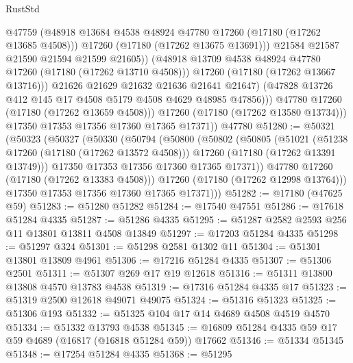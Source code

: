 \begin{lexlean}{RustStd}
\begin{coremodule}
                          @47759
                          (@48918 @13684 @4538 @48924 @47780 @17260 (@17180 (@17262 @13685 @4508)))
                          @17260
                          (@17180 (@17262 @13675 @13691)))
                        @21584
                        @21587
                        @21590
                        @21594
                        @21599
                        @21605))
                    (@48918 @13709 @4538 @48924 @47780 @17260 (@17180 (@17262 @13710 @4508)))
                    @17260
                    (@17180 (@17262 @13667 @13716)))
                  @21626
                  @21629
                  @21632
                  @21636
                  @21641
                  @21647)
                (@47828 @13726 @412 @145 @17 @4508 @5179 @4508 @4629 @48985 @47856)))
            @47780
            @17260
            (@17180 (@17262 @13659 @4508)))
          @17260
          (@17180 (@17262 @13580 @13734)))
        @17350
        @17353
        @17356
        @17360
        @17365
        @17371))
    @47780
@51280 := @50321
    (@50323
      (@50327
        (@50330
          (@50794
            (@50800
              (@50802
                (@50805
                  (@51021
                    (@51238 @17260 (@17180 (@17262 @13572 @4508)))
                    @17260
                    (@17180 (@17262 @13391 @13749)))
                  @17350
                  @17353
                  @17356
                  @17360
                  @17365
                  @17371))
              @47780
              @17260
              (@17180 (@17262 @13383 @4508)))
            @17260
            (@17180 (@17262 @12998 @13764)))
          @17350
          @17353
          @17356
          @17360
          @17365
          @17371)))
@51282 := @17180 (@47625 @59)
@51283 := @51280 @51282
@51284 := @17540 @47551
@51286 := @17618 @51284 @4335
@51287 := @51286 @4335
@51295 := @51287 @2582 @2593 @256 @11 @13801 @13811 @4508 @13849
@51297 := @17203 @51284 @4335
@51298 := @51297 @324
@51301 := @51298 @2581 @1302 @11
@51304 := @51301 @13801 @13809 @4961
@51306 := @17216 @51284 @4335
@51307 := @51306 @2501
@51311 := @51307 @269 @17 @19 @12618
@51316 := @51311 @13800 @13808 @4570 @13783 @4538
@51319 := @17316 @51284 @4335 @17
@51323 := @51319 @2500 @12618 @49071 @49075
@51324 := @51316 @51323
@51325 := @51306 @193
@51332 := @51325 @104 @17 @14 @4689 @4508 @4519 @4570
@51334 := @51332 @13793 @4538
@51345 := @16809 @51284 @4335 @59 @17 @59 @4689 (@16817 (@16818 @51284 @59)) @17662
@51346 := @51334 @51345
@51348 := @17254 @51284 @4335
@51368 := @51295

\end{coremodule}
\end{lexlean}
